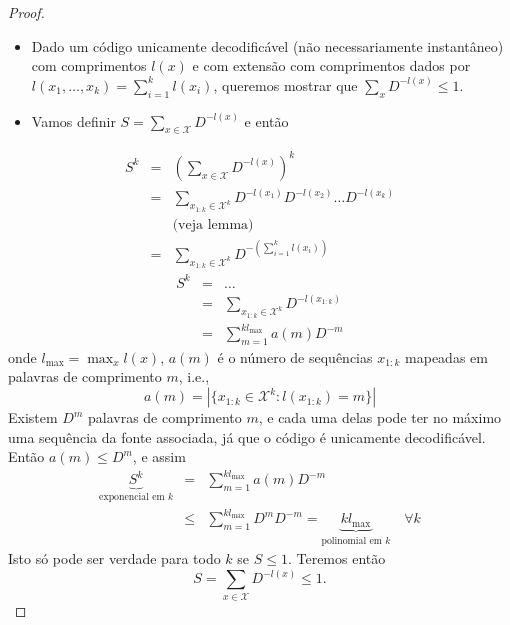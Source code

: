 \begin{frame}[allowframebreaks]
  \framebreak
  \begin{proof}
  \begin{itemize}
  \item Dado um código unicamente decodificável (não necessariamente instantâneo) com comprimentos $l(x)$
	e com extensão com comprimentos dados por $l(x_1, \ldots, x_k) = \sum_{i=1}^k l(x_i)$, queremos mostrar
	que $\sum_x D^{-l(x)} \leq 1$.
  \end{itemize}
  \proofbreak
  \begin{itemize}
  \item Vamos definir $S = \sum_{x \in \mathcal{X}} D^{-l(x)}$ e então
  \end{itemize}
  \begin{eqnarray}
	S^k &=& \left( \sum_{x \in \mathcal{X}} D^{-l(x)} \right)^k \nonumber \\
		&=& \sum_{x_{1:k} \in \mathcal{X}^k} D^{-l(x_1)} D^{-l(x_2)} \ldots D^{-l(x_k)} \nonumber \\
			&& \text{(veja lemma)} \nonumber \\
		&=& \sum_{x_{1:k} \in \mathcal{X}^k} D^{- \left( \sum_{i=1}^k l(x_i) \right)} 
  \end{eqnarray}
  \proofbreak
  \vspace{-0.5cm}
  \begin{eqnarray}
        S^k &=& \ldots \\
		&=& \sum_{x_{1:k} \in \mathcal{X}^k} D^{-l(x_{1:k})} \nonumber \\
		&=& \sum_{m=1}^{k l_{\text{max}}} a(m) D^{-m}
  \end{eqnarray}
  onde $l_{\text{max}} = \max_x l(x)$, $a(m)$ é o número de sequências $x_{1:k}$ mapeadas em palavras de comprimento $m$,
  i.e.,
  \begin{equation}
	a(m) = \left\vert \{ x_{1:k} \in \mathcal{X}^k : l(x_{1:k}) = m \} \right\vert
  \end{equation}
  \proofbreak
  Existem $D^m$ palavras de comprimento $m$, e cada uma delas pode ter no máximo uma sequência da fonte associada,
  já que o código é unicamente decodificável. Então $a(m) \leq D^m$, e assim
  \begin{eqnarray}
  \underbrace{S^k}_{\text{exponencial em } k} &=& \sum_{m=1}^{k l_{\text{max}}} a(m) D^{-m} \nonumber \\
		&\leq& \sum_{m=1}^{k l_{\text{max}}} D^m D^{-m} = \underbrace{k l_{\text{max}}}_{\text{polinomial em } k} \quad \forall k
  \end{eqnarray}
  Isto só pode ser verdade para todo $k$ se $S \leq 1$. 
  \proofbreak
  Teremos então
  \begin{equation}
  S = \sum_{x \in \mathcal{X}} D^{-l(x)} \leq 1 .
  \end{equation}
  \end{proof}
  

\end{frame}
